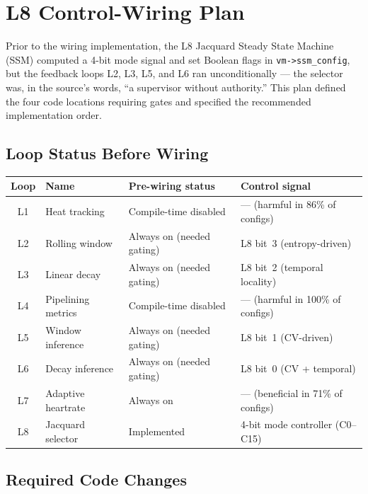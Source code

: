 
\section{L8 Control-Wiring Plan}
\label{sec:l8-wiring-plan}

Prior to the wiring implementation, the L8 Jacquard Steady State Machine
(SSM) computed a 4-bit mode signal and set Boolean flags in
\texttt{vm->ssm\_config}, but the feedback loops L2, L3, L5, and L6 ran
unconditionally — the selector was, in the source's words, ``a supervisor
without authority.'' This plan defined the four code locations requiring gates
and specified the recommended implementation order.

\subsection{Loop Status Before Wiring}

\begin{center}
\begin{tabular}{clll}
\toprule
Loop & Name & Pre-wiring status & Control signal \\
\midrule
L1 & Heat tracking     & Compile-time disabled & — (harmful in 86\% of configs) \\
L2 & Rolling window    & Always on (needed gating) & L8 bit~3 (entropy-driven) \\
L3 & Linear decay      & Always on (needed gating) & L8 bit~2 (temporal locality) \\
L4 & Pipelining metrics & Compile-time disabled & — (harmful in 100\% of configs) \\
L5 & Window inference  & Always on (needed gating) & L8 bit~1 (CV-driven) \\
L6 & Decay inference   & Always on (needed gating) & L8 bit~0 (CV + temporal) \\
L7 & Adaptive heartrate & Always on & — (beneficial in 71\% of configs) \\
L8 & Jacquard selector & Implemented & 4-bit mode controller (C0--C15) \\
\bottomrule
\end{tabular}
\end{center}

\subsection{Required Code Changes}


